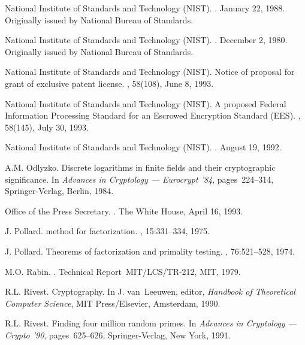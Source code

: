 \begin{thebibliography}{10}
{National Institute of Standards and Technology (NIST)}.
.
\newblock January 22, 1988.
\newblock Originally issued by National Bureau of Standards.

{National Institute of Standards and Technology (NIST)}.
.
\newblock December 2, 1980.
\newblock Originally issued by National Bureau of Standards.

{National Institute of Standards and Technology (NIST)}.
\newblock Notice of proposal for grant of exclusive patent license.
, 58(108), June 8, 1993.

{National Institute of Standards and Technology (NIST)}.
\newblock A proposed {Federal Information Processing Standard} for an {Escrowed
  Encryption Standard (EES)}.
, 58(145), July 30, 1993.

{National Institute of Standards and Technology (NIST)}.
.
\newblock August 19, 1992.

A.M. Odlyzko.
\newblock Discrete logarithms in finite fields and their cryptographic
  significance.
\newblock In {\it Advances in Cryptology --- Eurocrypt '84}, pages~224--314,
  Springer-Verlag, Berlin, 1984.

{Office of the Press Secretary}.
.
\newblock The White House, April 16, 1993.

J. Pollard.
 method for factorization.
, 15:331--334, 1975.

J. Pollard.
\newblock Theorems of factorization and primality testing.
, 76:521--528, 1974.

M.O. Rabin.
.
\newblock Technical Report~MIT/LCS/TR-212, MIT, 1979.

R.L. Rivest.
\newblock Cryptography.
\newblock In J. van~Leeuwen, editor, {\it Handbook of Theoretical Computer
  Science}, MIT Press/Elsevier, Amsterdam, 1990.

R.L. Rivest.
\newblock Finding four million random primes.
\newblock In {\it Advances in Cryptology --- Crypto '90}, pages~625--626,
  Springer-Verlag, New York, 1991.


\end{thebibliography}
